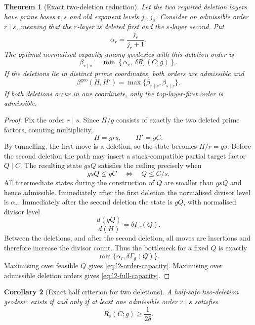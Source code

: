 \documentclass[11pt]{article}
\numberwithin{equation}{section}
\theoremstyle{blueplain}
\newtheorem{theorem}{Theorem}[section]
\newtheorem{corollary}[theorem]{Corollary}
\theoremstyle{bluedef}
\newcommand{\betageo}{\beta^{\mathrm{geo}}}
\begin{document}
\begin{theorem}[Exact two-deletion reduction]
\label{thm:l2-reduction}
Let the two required deletion layers have prime bases $r,s$ and old exponent levels $j_r,j_s$.  Consider an admissible order $r\mid s$, meaning that the $r$-layer is deleted first and the $s$-layer second.  Put
\begin{equation}
 \alpha_r=\frac{j_r}{j_r+1}.
 \label{eq:first-deletion-factor}
\end{equation}
The optimal normalised capacity among geodesics with this deletion order is
\begin{equation}
 \boxed{
 \beta_{r\mid s}=
 \min\left\{\alpha_r,\ \delta R_s(C;g)\right\}.}
 \label{eq:l2-order-capacity}
\end{equation}
If the deletions lie in distinct prime coordinates, both orders are admissible and
\begin{equation}
 \boxed{
 \betageo(H,H')=
 \max\{\beta_{r\mid s},\beta_{s\mid r}\}.}
 \label{eq:l2-full-capacity}
\end{equation}
If both deletions occur in one coordinate, only the top-layer-first order is admissible.
\end{theorem}

\begin{proof}
Fix the order $r\mid s$.  Since $H/g$ consists of exactly the two deleted prime factors, counting multiplicity,
\[
 H=grs,
 \qquad
 H'=gC.
\]
By tunnelling, the first move is a deletion, so the state becomes $H/r=gs$.  Before the second deletion the path may insert a stack-compatible partial target factor $Q\mid C$.  The resulting state $gsQ$ satisfies the ceiling precisely when
\[
 gsQ\le gC
 \quad\Longleftrightarrow\quad
 Q\le C/s.
\]
All intermediate states during the construction of $Q$ are smaller than $gsQ$ and hence admissible.  Immediately after the first deletion the normalised divisor level is $\alpha_r$.  Immediately after the second deletion the state is $gQ$, with normalised divisor level
\[
 \frac{d(gQ)}{d(H)}=\delta\Gamma_g(Q).
\]
Between the deletions, and after the second deletion, all moves are insertions and therefore increase the divisor count.  Thus the bottleneck for a fixed $Q$ is exactly
\[
 \min\{\alpha_r,\delta\Gamma_g(Q)\}.
\]
Maximising over feasible $Q$ gives \eqref{eq:l2-order-capacity}.  Maximising over admissible deletion orders gives \eqref{eq:l2-full-capacity}.
\end{proof}

\begin{corollary}[Exact half criterion for two deletions]
\label{cor:l2-half-criterion}
A half-safe two-deletion geodesic exists if and only if at least one admissible order $r\mid s$ satisfies
\begin{equation}
 \boxed{R_s(C;g)\ge\frac{1}{2\delta}.}
 \label{eq:l2-half-criterion}
\end{equation}
\end{corollary}
\end{document}
